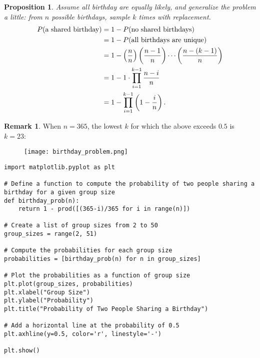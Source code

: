 \documentclass[12pt,openany]{book}
\newtheorem{proposition}[theorem]{Proposition}
\theoremstyle{definition}
\newtheorem{remark}{Remark}[chapter]
\newcommand{\of}[1]{\left( #1 \right)}
\begin{document}
	\begin{tcolorbox}[colback=white,colframe=procolor,arc=5pt,title={\color{white}\bf Generalization of Birthday Problem}]
		\begin{proposition}
			Assume all birthday are equally likely, and generalize the problem a little: \textnormal{from $n$ possible birthdays, sample $k$ times with replacement}. \begin{align*}
				P(\textnormal{a shared birthday})&=1-P(\textnormal{no shared birthdays})\\
				&=1-P(\textnormal{all birthdays are unique})\\
				&=1-\of{\frac{n}{n}}\of{\frac{n-1}{n}}\cdots\of{\frac{n-(k-1)}{n}}\\
				&=1-1\cdot \prod_{i=1}^{k-1}\frac{n-i}{n}\\
				&=1-\prod_{i=1}^{k-1}\of{1-\frac{i}{n}}.
			\end{align*}
		\end{proposition}
	\end{tcolorbox}

	\newpage
	\begin{remark}
		When $n=365$, the lowest $k$ for which the above exceeds $0.5$ is $k=23$: \begin{figure}[ht!]
			\centering
			\texttt{[image: birthday\_problem.png]}
		\end{figure}
		\begin{lstlisting}[style=sage, caption={Birthday Bound (Sage)},captionpos=t]
import matplotlib.pyplot as plt

# Define a function to compute the probability of two people sharing a birthday for a given group size
def birthday_prob(n):
	return 1 - prod([(365-i)/365 for i in range(n)])

# Create a list of group sizes from 2 to 50
group_sizes = range(2, 51)

# Compute the probabilities for each group size
probabilities = [birthday_prob(n) for n in group_sizes]

# Plot the probabilities as a function of group size
plt.plot(group_sizes, probabilities)
plt.xlabel("Group Size")
plt.ylabel("Probability")
plt.title("Probability of Two People Sharing a Birthday")

# Add a horizontal line at the probability of 0.5
plt.axhline(y=0.5, color='r', linestyle='-')

plt.show()
		\end{lstlisting}
	\end{remark}
\end{document}
